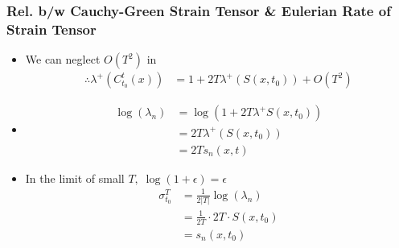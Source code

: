 \documentclass[../presentation.tex]{subfiles}
\begin{document}
\begin{frame}
  \frametitle{\small Rel. b/w Cauchy-Green Strain Tensor \& Eulerian Rate of Strain Tensor}

  \begin{itemize}
    \item We can neglect \(O(T^2)\) in
    \begin{equation}
      \begin{aligned}
        \therefore \lambda^+ (C_{t_0}^t (x)) &= 1 + 2T \lambda^+ (S(x, t_0)) + O(T^2)
      \end{aligned}
    \end{equation}
    
    \item \begin{equation}
      \begin{aligned}
        \log(\lambda_n) &= \log(1 + 2T\lambda^+S(x, t_0)) \\
        &= 2T\lambda^+(S(x, t_0)) \\
        &= 2Ts_n(x, t)
      \end{aligned}
    \end{equation}
    
    \item In the limit of small \(T,\; \log(1+\epsilon) = \epsilon\)
    \begin{equation}
      \begin{aligned}
        \sigma_{t_0}^T &= \frac{1}{2|T|}\log(\lambda_n) \\
        &= \frac{1}{2T} \cdot 2T \cdot S(x, t_0) \\
        &= s_n(x, t_0)
      \end{aligned}
    \end{equation}
  \end{itemize}
\end{frame}
\end{document}
